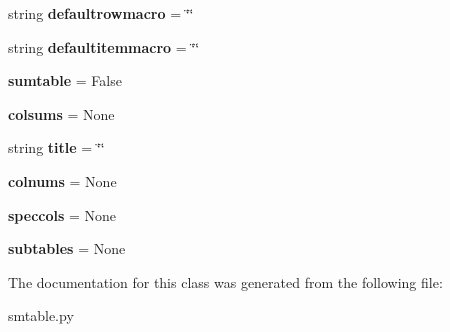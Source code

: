 \begin{DoxyCompactItemize}
\item 
\hypertarget{classsmtable_1_1TableData_ab9bafffe77e2bd1507139feacb339c23}{
string {\bfseries defaultrowmacro} = \char`\"{}\char`\"{}}
\label{classsmtable_1_1TableData_ab9bafffe77e2bd1507139feacb339c23}

\item 
\hypertarget{classsmtable_1_1TableData_a82ee4942465b9807e77ad18449292dcd}{
string {\bfseries defaultitemmacro} = \char`\"{}\char`\"{}}
\label{classsmtable_1_1TableData_a82ee4942465b9807e77ad18449292dcd}

\item 
\hypertarget{classsmtable_1_1TableData_a4043c9b0a1ba7a75d3b19faa5d10c6dd}{
{\bfseries sumtable} = False}
\label{classsmtable_1_1TableData_a4043c9b0a1ba7a75d3b19faa5d10c6dd}

\item 
\hypertarget{classsmtable_1_1TableData_a80ce324236b54e46587e1995cb914191}{
{\bfseries colsums} = None}
\label{classsmtable_1_1TableData_a80ce324236b54e46587e1995cb914191}

\item 
\hypertarget{classsmtable_1_1TableData_ac459112af23be0848d754ceed2e7bf8a}{
string {\bfseries title} = \char`\"{}\char`\"{}}
\label{classsmtable_1_1TableData_ac459112af23be0848d754ceed2e7bf8a}

\item 
\hypertarget{classsmtable_1_1TableData_addd884d051692479806aae52de0c3319}{
{\bfseries colnums} = None}
\label{classsmtable_1_1TableData_addd884d051692479806aae52de0c3319}

\item 
\hypertarget{classsmtable_1_1TableData_a7e1a18f45613ff52ab983922089a556d}{
{\bfseries speccols} = None}
\label{classsmtable_1_1TableData_a7e1a18f45613ff52ab983922089a556d}

\item 
\hypertarget{classsmtable_1_1TableData_a641e781ae8e2d764f710b6e03fdfeb00}{
{\bfseries subtables} = None}
\label{classsmtable_1_1TableData_a641e781ae8e2d764f710b6e03fdfeb00}

\end{DoxyCompactItemize}


The documentation for this class was generated from the following file:\begin{DoxyCompactItemize}
\item 
smtable.py\end{DoxyCompactItemize}
